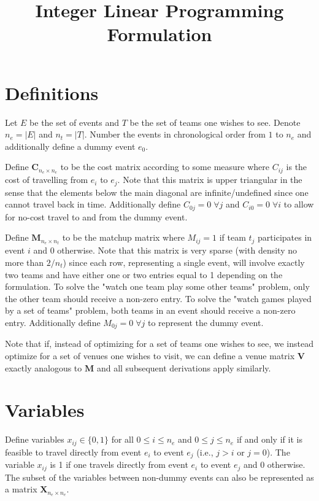 \documentclass[11pt]{article}
\title{Integer Linear Programming Formulation}
\date{}
\begin{document}
\maketitle

\section{Definitions}
Let $E$ be the set of events and $T$ be the set of teams one wishes to see. Denote $n_e = |E|$ and $n_t = |T|$. Number the events in chronological order from $1$ to $n_e$ and additionally define a dummy event $e_0$.

Define $\mathbf{C}_{n_e \times n_e}$ to be the cost matrix according to some measure where $C_{ij}$ is the cost of travelling from $e_i$ to $e_j$. Note that this matrix is upper triangular in the sense that the elements below the main diagonal are infinite/undefined since one cannot travel back in time. Additionally define $C_{0j} = 0 \; \forall j$ and $C_{i0} = 0 \; \forall i$ to allow for no-cost travel to and from the dummy event.

Define $\mathbf{M}_{n_e \times n_t}$ to be the matchup matrix where $M_{ij} = 1$ if team $t_j$ participates in event $i$ and 0 otherwise. Note that this matrix is very sparse (with density no more than $2/n_t$) since each row, representing a single event, will involve exactly two teams and have either one or two entries equal to 1 depending on the formulation. To solve the "watch one team play some other teams" problem, only the other team should receive a non-zero entry. To solve the "watch games played by a set of teams" problem, both teams in an event should receive a non-zero entry. Additionally define $M_{0j} = 0 \; \forall j$ to represent the dummy event.

Note that if, instead of optimizing for a set of teams one wishes to see, we instead optimize for a set of venues one wishes to visit, we can define a venue matrix $\mathbf{V}$ exactly analogous to $\mathbf{M}$ and all subsequent derivations apply similarly.

\section{Variables}
Define variables $x_{ij} \in \{0, 1\}$ for all $0 \leq i \leq n_e$ and $0 \leq j \leq n_e$ if and only if it is feasible to travel directly from event $e_i$ to event $e_j$ (i.e., $j > i$ or $j = 0$). The variable $x_{ij}$ is 1 if one travels directly from event $e_i$ to event $e_j$ and 0 otherwise. The subset of the variables between non-dummy events can also be represented as a matrix $\mathbf{X}_{n_e \times n_e}$.
\end{document}
